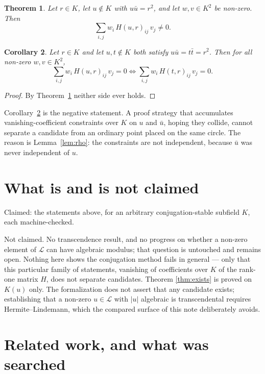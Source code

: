 \documentclass[11pt]{article}
\newtheorem{theorem}{Theorem}[section]
\newtheorem{corollary}[theorem]{Corollary}
\theoremstyle{definition}
\theoremstyle{remark}
\begin{document}
\begin{theorem}\label{thm:novanish}
Let $r\in K$, let $u\notin K$ with $u\bar u=r^{2}$, and let
$w,v\in K^{2}$ be non-zero. Then
\[
  \sum_{i,j} w_i\,H(u,r)_{ij}\,v_j \neq 0 .
\]
\end{theorem}

\begin{corollary}\label{cor:indist}
Let $r\in K$ and let $u,t\notin K$ both satisfy $u\bar u=t\bar t=r^{2}$. Then
for all non-zero $w,v\in K^{2}$,
\[
  \sum_{i,j} w_i\,H(u,r)_{ij}\,v_j = 0
  \iff
  \sum_{i,j} w_i\,H(t,r)_{ij}\,v_j = 0 .
\]
\end{corollary}

\begin{proof}
By Theorem~\ref{thm:novanish} neither side ever holds.
\end{proof}

Corollary~\ref{cor:indist} is the negative statement. A proof strategy that
accumulates vanishing-coefficient constraints over $K$ on $u$ and $\bar u$,
hoping they collide, cannot separate a candidate from an ordinary point placed
on the same circle. The reason is Lemma~\ref{lem:rho}: the constraints are not
independent, because $\bar u$ was never independent of $u$.

\section{What is and is not claimed}

Claimed: the statements above, for an arbitrary conjugation-stable subfield $K$,
each machine-checked.

Not claimed. No transcendence result, and no progress on whether a non-zero
element of $\mathcal{L}$ can have algebraic modulus; that question is untouched
and remains open. Nothing here shows the conjugation method fails in general ---
only that this particular family of statements, vanishing of coefficients over
$K$ of the rank-one matrix $H$, does not separate candidates. Theorem
\ref{thm:exists} is proved on $K(u)$ only. The formalization does not assert
that any candidate exists; establishing that a non-zero $u\in\mathcal{L}$ with
$|u|$ algebraic is transcendental requires Hermite--Lindemann, which the
compared surface of this note deliberately avoids.

\section{Related work, and what was searched}
\end{document}
